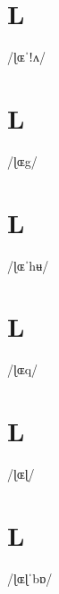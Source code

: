 \documentclass[10pt,a4paper,twoside]{book}
\begin{document}
\section*{L}

\begin{multicols}{3}
 {/ɭɶˈǃʌ/} {}
\end{multicols}

\section*{L}

\begin{multicols}{3}
 {/ɭɶg/} {}
\end{multicols}

\section*{L}

\begin{multicols}{3}
 {/ɭɶˈhʉ/} {}
\end{multicols}

\section*{L}

\begin{multicols}{3}
 {/ɭɶq/} {}
\end{multicols}

\section*{L}

\begin{multicols}{3}
 {/ɭɶɭ/} {}
\end{multicols}

\section*{L}

\begin{multicols}{3}
 {/ɭɶɭˈbɒ/} {}
\end{multicols}
\end{document}
